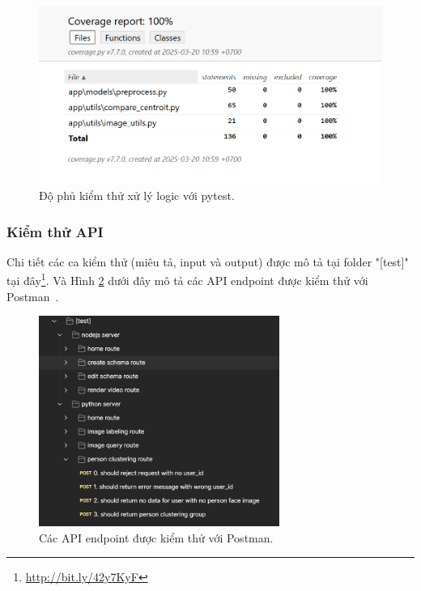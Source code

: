 
\begin{figure}[H]
    \centering  
    \includegraphics[width=1\textwidth]{figures/c4/4-3/pytest_2.png}
    \caption{Độ phủ kiểm thử xử lý logic với pytest.}
    \label{fig:pytest-testing}
\end{figure}


\subsubsection{Kiểm thử API}

Chi tiết các ca kiểm thử (miêu tả, input và output) được mô tả tại folder "[test]" tại đây\footnote{\url{http://bit.ly/42y7KyF}}. 
Và Hình \ref{fig:postman} dưới đây mô tả các API endpoint được kiểm thử với Postman~\cite{postman}.  

\begin{figure}[H]
    \centering  
    \includegraphics[width=0.7\textwidth]{figures/c4/4-3/api.png}
    \caption{Các API endpoint được kiểm thử với Postman.}
    \label{fig:postman}
\end{figure}


